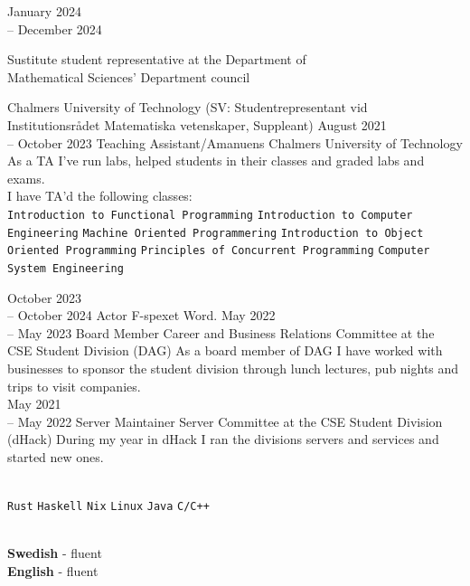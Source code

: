 \documentclass[9pt]{developercv}
\begin{document}
\begin{entrylist}
	\entry
		{January 2024 \\-- December 2024}
		{
			\begin{minipage}[t]{0.5\textwidth}
				Sustitute student representative at the Department of \\
				Mathematical Sciences' Department council
			\end{minipage}
		}
		{Chalmers University of Technology}
		{(SV: Studentrepresentant vid Institutionsrådet Matematiska vetenskaper, Suppleant)}
	\entry
		{August 2021 \\-- October 2023}
		{Teaching Assistant/Amanuens}
		{Chalmers University of Technology}
		{
			As a TA I've run labs, helped students in their classes and
			graded labs and exams.\\ I have TA'd the following classes:\\
			\texttt{Introduction to Functional Programming}\slashsep
			\texttt{Introduction to Computer Engineering}\slashsep
			\texttt{Machine Oriented Programmering}\slashsep
			\texttt{Introduction to Object Oriented Programming}\slashsep
			\texttt{Principles of Concurrent Programming}\slashsep
			\texttt{Computer System Engineering}
		}
\end{entrylist}
\begin{entrylist}
	\entry
		{October 2023 \\-- October 2024}
		{Actor}
		{F-spexet}
		{
			Word.
		}
	\entry
		{May 2022 \\-- May 2023}
		{Board Member}
		{Career and Business Relations Committee at the CSE Student Division (DAG)}
		{
			As a board member of DAG I have worked with
			businesses to sponsor the student division through
			lunch lectures, pub nights and trips to visit
			companies.\\
		}
	\entry
		{May 2021 \\-- May 2022}
		{Server Maintainer}
		{Server Committee at the CSE Student Division (dHack)}
		{
			During my year in dHack I ran the divisions servers and services and started new ones.\\
		}
\end{entrylist}
\hfill\\
	{
		\texttt{Rust}\slashsep
		\texttt{Haskell}\slashsep
		\texttt{Nix}\slashsep
		\texttt{Linux}\slashsep
		\texttt{Java}\slashsep
		\texttt{C/C++}
	}\\
\begin{minipage}[t]{0.2\textwidth}
	\vspace{-\baselineskip}
	\\
	\textbf{Swedish} - fluent\\
	\textbf{English} - fluent
\end{minipage}
\end{document}
